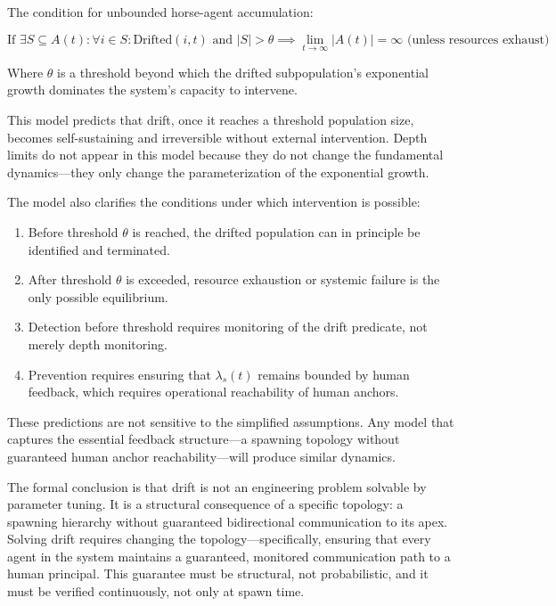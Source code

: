 The condition for unbounded horse-agent accumulation:

\[
\text{If } \exists S \subseteq A(t) : \forall i \in S : \text{Drifted}(i, t) \text{ and } |S| > \theta \implies \lim_{t \to \infty} |A(t)| = \infty \text{ (unless resources exhaust)}
\]

Where $\theta$ is a threshold beyond which the drifted subpopulation's exponential growth dominates the system's capacity to intervene.

This model predicts that drift, once it reaches a threshold population size, becomes self-sustaining and irreversible without external intervention. Depth limits do not appear in this model because they do not change the fundamental dynamics—they only change the parameterization of the exponential growth.

The model also clarifies the conditions under which intervention is possible:

\begin{enumerate}
    \item Before threshold $\theta$ is reached, the drifted population can in principle be identified and terminated.
    \item After threshold $\theta$ is exceeded, resource exhaustion or systemic failure is the only possible equilibrium.
    \item Detection before threshold requires monitoring of the drift predicate, not merely depth monitoring.
    \item Prevention requires ensuring that $\lambda_s(t)$ remains bounded by human feedback, which requires operational reachability of human anchors.
\end{enumerate}

These predictions are not sensitive to the simplified assumptions. Any model that captures the essential feedback structure—a spawning topology without guaranteed human anchor reachability—will produce similar dynamics.

The formal conclusion is that drift is not an engineering problem solvable by parameter tuning. It is a structural consequence of a specific topology: a spawning hierarchy without guaranteed bidirectional communication to its apex. Solving drift requires changing the topology—specifically, ensuring that every agent in the system maintains a guaranteed, monitored communication path to a human principal. This guarantee must be structural, not probabilistic, and it must be verified continuously, not only at spawn time.

